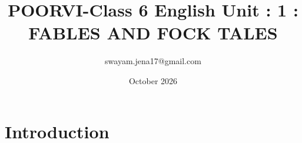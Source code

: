 \documentclass{book}
\begin{document}
\title{POORVI-Class 6 English Unit : 1 : FABLES AND FOCK TALES}
\author{swayam.jena17@gmail.com}
\date{October 2026}

\maketitle
\section{Introduction}




\end{document}
